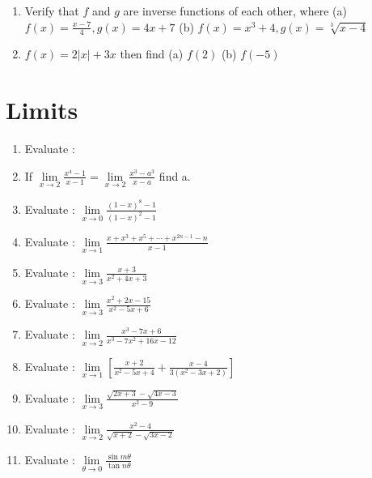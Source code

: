\documentclass[14pt]{article}
\begin{document}
\begin{multicols}{2}
\begin{enumerate}[resume]
\item Verify that $ f $  and  $ g $ are inverse functions of each other, where (a) $ f(x) = \frac { x - 7 }{4}, g(x) = 4x + 7 $ (b) $ f(x) = x^3 + 4, g(x) = \sqrt[3]{x - 4 } $

\item $ f(x) = 2 \left| x \right| + 3x $ then find (a) $ f(2)$ (b) $ f(-5) $

\end{enumerate} 

\section{Limits}
\noindent
\begin{enumerate}[resume]
\item Evaluate : 
 
\item If $ \lim\limits_{x \to 2} \frac{ x^4 - 1}{ x - 1} = \lim\limits_{x \to 2} \frac{ x^3 - a^3}{x-a} $ find a.

\item Evaluate : $ \lim\limits_{x \to 0} \frac{ (1- x)^8 - 1}{(1- x)^2 - 1} $ 

 \item Evaluate : $ \lim\limits_{ x \to 1 } \frac{ x + x^3 + x^5 +\cdots +x^{2n - 1} - n }{x-1} $
 
 \item Evaluate : $ \lim\limits_{x \to 3} \frac{ x + 3}{ x^2 +4x + 3 } $
 
\item Evaluate : $ \lim\limits_{x \to 3} \frac{ x^2 + 2x - 15}{ x^2 - 5x + 6 } $

\item Evaluate : $ \lim\limits_{x \to 2} \frac{ x^3 - 7x + 6}{ x^3 - 7x^2 + 16x - 12   } $

\item Evaluate : $ \lim\limits_{ x \to 1 } \left[ \frac{ x + 2 }{x^2-5x + 4} + \frac{ x - 4 }{3(x^2-3x+2)} \right] $

\item Evaluate : $ \lim\limits_{x \to 3} \frac{ \sqrt{ 2x + 3 } - \sqrt{ 4x - 3 } }{ x^2 - 9 } $

\item Evaluate : $ \lim\limits_{x \to 2} \frac{ x^2 - 4 }{ \sqrt{ x + 2 } - \sqrt{ 3x - 2 }  } $

 \item Evaluate : $ \lim\limits_{ \theta \to 0} \frac{ \sin m\theta }{ \tan n\theta}$
 

\end{enumerate}
\end{multicols}
\end{document}

